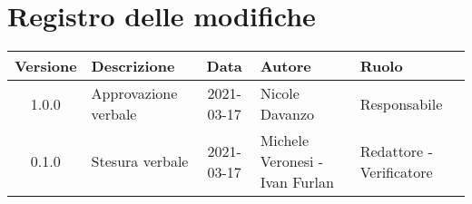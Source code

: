 \section*{Registro delle modifiche}

\begin{center}
	\begin{longtable}{|c|p{4cm}|c|p{3cm}|p{3cm}|}
		\hline
		\rowcolor{lighter-grayer}
		\textbf{Versione} & \textbf{Descrizione} & \textbf{Data} & \textbf{Autore} & \textbf{Ruolo} \\
		\hline
		\endfirsthead


		\hline
		1.0.0 & Approvazione verbale & 2021-03-17 & Nicole Davanzo & Responsabile \\
		0.1.0 & Stesura verbale & 2021-03-17 & Michele Veronesi - Ivan Furlan & Redattore - Verificatore \\
		\hline
	\end{longtable}
\end{center}